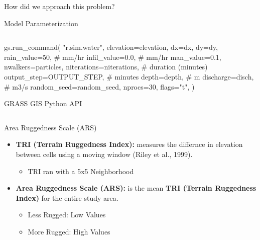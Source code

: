\documentclass[
  ignorenonframetext,
]{beamer}
\newenvironment{Shaded}{\begin{snugshade}}{\end{snugshade}}
\newcommand{\CommentTok}[1]{\textcolor[rgb]{0.37,0.37,0.37}{#1}}
\newcommand{\DecValTok}[1]{\textcolor[rgb]{0.68,0.00,0.00}{#1}}
\newcommand{\FloatTok}[1]{\textcolor[rgb]{0.68,0.00,0.00}{#1}}
\newcommand{\NormalTok}[1]{\textcolor[rgb]{0.00,0.23,0.31}{#1}}
\newcommand{\OperatorTok}[1]{\textcolor[rgb]{0.37,0.37,0.37}{#1}}
\newcommand{\StringTok}[1]{\textcolor[rgb]{0.13,0.47,0.30}{#1}}
\providecommand{\tightlist}{%
  \setlength{\itemsep}{0pt}\setlength{\parskip}{0pt}}\usepackage{longtable,booktabs,array}
\begin{document}
\begin{frame}[fragile]{How did we approach this problem?}
\begin{block}{Model Parameterization}
\begin{columns}[T]
\begin{column}{0.5\textwidth}
\begin{Shaded}
\begin{Highlighting}[]
\NormalTok{    gs.run\_command(}
        \StringTok{"r.sim.water"}\NormalTok{,}
\NormalTok{        elevation}\OperatorTok{=}\NormalTok{elevation,}
\NormalTok{        dx}\OperatorTok{=}\NormalTok{dx,}
\NormalTok{        dy}\OperatorTok{=}\NormalTok{dy,}
\NormalTok{        rain\_value}\OperatorTok{=}\DecValTok{50}\NormalTok{,  }\CommentTok{\# mm/hr}
\NormalTok{        infil\_value}\OperatorTok{=}\FloatTok{0.0}\NormalTok{,  }\CommentTok{\# mm/hr}
\NormalTok{        man\_value}\OperatorTok{=}\FloatTok{0.1}\NormalTok{,}
\NormalTok{        nwalkers}\OperatorTok{=}\NormalTok{particles,}
\NormalTok{        niterations}\OperatorTok{=}\NormalTok{niterations,  }\CommentTok{\# duration (minutes)}
\NormalTok{        output\_step}\OperatorTok{=}\NormalTok{OUTPUT\_STEP,  }\CommentTok{\# minutes}
\NormalTok{        depth}\OperatorTok{=}\NormalTok{depth,  }\CommentTok{\# m}
\NormalTok{        discharge}\OperatorTok{=}\NormalTok{disch,  }\CommentTok{\# m3/s}
\NormalTok{        random\_seed}\OperatorTok{=}\NormalTok{random\_seed,}
\NormalTok{        nprocs}\OperatorTok{=}\DecValTok{30}\NormalTok{,}
\NormalTok{        flags}\OperatorTok{=}\StringTok{"t"}\NormalTok{,}
\NormalTok{    )}
\end{Highlighting}
\end{Shaded}

GRASS GIS Python API
\end{column}
\end{columns}
\end{block}

\begin{block}{Area Ruggedness Scale (ARS)}
\label{area-ruggedness-scale-ars}
\begin{itemize}
\item
  \textbf{TRI (Terrain Ruggedness Index):} measures the differnce in
  elevation between cells using a moving window (Riley et al., 1999).

  \begin{itemize}
  \tightlist
  \item
    TRI ran with a 5x5 Neighborhood
  \end{itemize}
\item
  \textbf{Area Ruggedness Scale (ARS):} is the mean \textbf{TRI (Terrain
  Ruggedness Index)} for the entire study area.

  \begin{itemize}
  \tightlist
  \item
    Less Rugged: Low Values
  \item
    More Rugged: High Values
  \end{itemize}
\end{itemize}
\end{block}


\end{frame}
\end{document}
